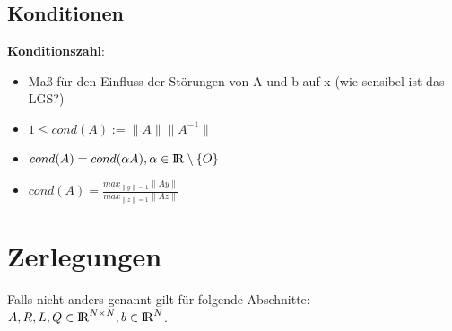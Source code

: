 \documentclass[10pt,a4paper]{article}
\def\realnumbers{{\rm I\!R}}
\newcommand{\norm}[1]{\lVert#1\rVert}
\begin{document}
	\subsection{Konditionen}
	\textbf{Konditionszahl}:
	\begin{itemize}
		\item Maß für den Einfluss der Störungen von A und b auf x (wie sensibel ist das LGS?)
		\item $1 \leq cond(A) := \norm{A}\norm{A^{-1}}$
		\item $cond(A) = cond(\alpha A), \alpha\in\realnumbers\setminus\{O\}$
		\item $cond(A) = \frac{max_{\norm{y}=1}\norm{Ay}}{max_{\norm{z}=1}\norm{Az}}$
	\end{itemize}
		
	\section{Zerlegungen}
	Falls nicht anders genannt gilt für folgende Abschnitte: $A, R, L, Q \in \realnumbers^{N \times N}, b \in \realnumbers^N$.
\end{document}
